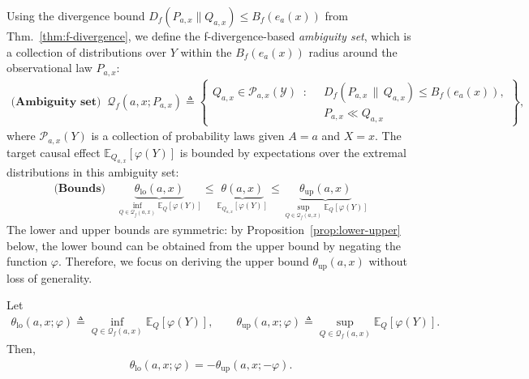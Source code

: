 Using the divergence bound $D_f(P_{a,x} \| Q_{a,x}) \leq B_f(e_a(x))$ from Thm.~\ref{thm:f-divergence}, we define the f-divergence-based \textit{ambiguity set}, which is a collection of distributions over $Y$ within the $B_f(e_a(x))$ radius around the observational law $P_{a,x}$: 
\begin{align}\label{eq:ambiguity-set}
\textbf{(Ambiguity set)}\;\;
\mathcal Q_f(a,x; P_{a,x}) \triangleq 
\left\{
\begin{aligned}
Q_{a,x}\in\mathcal P_{a,x}(\mathcal Y)
\;\; :\;\;
& D_f\!\left(P_{a,x}\,\|\, Q_{a,x}\right) \le B_f(e_a(x)), \\
& P_{a,x} \ll Q_{a,x}
\end{aligned}
\right\},
\end{align}
where $\mathcal{P}_{a,x}(Y)$ is a collection of probability laws given $A=a$ and $X=x$. The target causal effect $\mathbb{E}_{Q_{a,x}}[\varphi(Y)]$ is bounded by expectations over the extremal distributions in this ambiguity set:
\begin{align}\label{eq:initial-optimization}
    \textbf{(Bounds)}\quad \underbrace{ \theta_{\mathrm{lo}}(a,x) }_{\inf_{Q \in \mathcal Q_f(a,x)} \mathbb{E}_{Q}[\varphi(Y)]} \leq \underbrace{\theta(a,x)}_{\mathbb{E}_{Q_{a,x}}[\varphi(Y)]} \leq \underbrace{ \theta_{\mathrm{up}}(a,x) }_{ \sup_{Q \in \mathcal Q_f(a,x)} \mathbb{E}_{Q}[\varphi(Y)] }
\end{align}
The lower and upper bounds are symmetric: by Proposition~\ref{prop:lower-upper} below, the lower bound can be obtained from the upper bound by negating the function $\varphi$. Therefore, we focus on deriving the upper bound $\theta_{\mathrm{up}}(a,x)$ without loss of generality. 
\begin{proposition}\label{prop:lower-upper}
    \normalfont
    Let 
    \begin{align}
        \theta_{\mathrm{lo}}(a,x; \varphi) \triangleq \inf_{Q \in \mathcal Q_f(a,x)} \mathbb{E}_{Q}[\varphi(Y)], \qquad \theta_{\mathrm{up}}(a,x;\varphi) \triangleq \sup_{Q \in \mathcal Q_f(a,x)} \mathbb{E}_{Q}[\varphi(Y)].
    \end{align}
    Then, 
    \begin{align}
        \theta_{\mathrm{lo}}(a,x; \varphi) = -  \theta_{\mathrm{up}}(a,x;-\varphi).
    \end{align}
\end{proposition}


